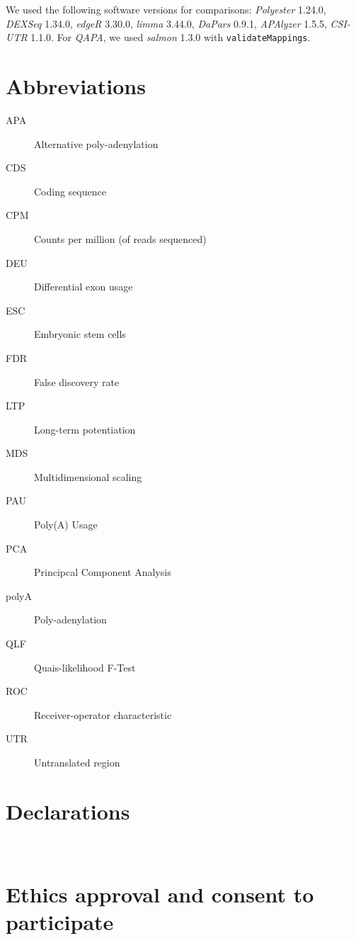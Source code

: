 \documentclass{bmcart}
\begin{document}
We used the following software versions for comparisons: \textit{Polyester} 1.24.0, \textit{DEXSeq} 1.34.0, \textit{edgeR} 3.30.0, \textit{limma} 3.44.0, \textit{DaPars} 0.9.1, \textit{APAlyzer} 1.5.5, \textit{CSI-UTR} 1.1.0. For \textit{QAPA}, we used \textit{salmon} 1.3.0 with \texttt{validateMappings}.



\begin{backmatter}

\section*{Abbreviations}

\begin{description}

\item[APA] Alternative poly-adenylation
\item[CDS] Coding sequence
\item[CPM] Counts per million (of reads sequenced)
\item[DEU] Differential exon usage
\item[ESC] Embryonic stem cells
\item[FDR] False discovery rate
\item[LTP] Long-term potentiation
\item[MDS] Multidimensional scaling
\item[PAU] Poly(A) Usage
\item[PCA] Principcal Component Analysis
\item[polyA] Poly-adenylation
\item[QLF] Quais-likelihood F-Test
\item[ROC] Receiver-operator characteristic
\item[UTR] Untranslated region

\end{description}

\section*{Declarations}
\\

\section*{Ethics approval and consent to participate}


\end{backmatter}
\end{document}
